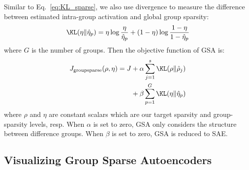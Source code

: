 Similar to Eq.~\ref{eq:KL_sparse}, we also use \KL divergence to measure the difference between estimated intra-group activation and global group sparsity: %
\begin{equation}\label{eq:KL_grop}
    \KL(\eta \| \hat{\eta}_p) = \eta\log\frac{\eta}{\hat{\eta}_p} + (1-\eta)\log\frac{1-\eta}{1-\hat{\eta}_p}
\end{equation}
where $G$ is the number of groups. Then the objective function of GSA is: %
\begin{equation}\label{eq:loss_sgl}
\begin{split}
J_\text{groupsparse}(\rho, \eta) = J & + \alpha \sum_{j=1}^s \KL(\rho \| \hat{\rho}_j) \\
& + \beta \sum_{p=1}^G \KL(\eta \| \hat{\eta}_p)
\end{split}
\end{equation}
where $\rho$ and $\eta$ are constant scalars which are our target sparsity and group-sparsity levels, resp.
When $\alpha$ is set to zero, GSA only considers the structure between difference groups. When $\beta$ is set to zero, GSA is reduced to SAE.  









\subsection{Visualizing Group Sparse Autoencoders}

